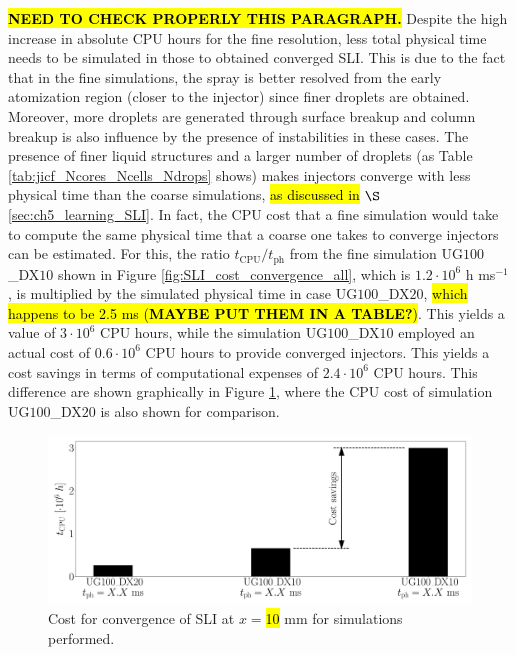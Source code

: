 \hl{\textbf{NEED TO CHECK PROPERLY THIS PARAGRAPH.}} Despite the high increase in absolute CPU hours for the fine resolution, less total physical time needs to be simulated in those to obtained converged SLI. This is due to the fact that in the fine simulations, the spray is better resolved from the early atomization region (closer to the injector) since finer droplets are obtained. Moreover,  more droplets are generated through surface breakup and column breakup is also influence by the presence of instabilities in these cases. The presence of finer liquid structures and a larger number of droplets (as Table \ref{tab:jicf_Ncores_Ncells_Ndrops} shows) makes injectors converge with less physical time than the coarse simulations, \hl{as discussed in} $\S$ \ref{sec:ch5_learning_SLI}. In fact, the CPU cost that a fine simulation would take to compute the same physical time that a coarse one takes to converge injectors can be estimated. For this, the ratio $t_\mathrm{CPU}/t_\mathrm{ph}$ from the fine simulation UG$100$\_DX$10$ shown in Figure \ref{fig:SLI_cost_convergence_all}, which is $1.2 \cdot 10^6$ h ms$^{-1}$, is multiplied by the simulated physical time in case UG$100$\_DX$20$, \hl{which happens to be 2.5 ms (\textbf{MAYBE PUT THEM IN A TABLE?})}. This yields a value of $3 \cdot 10^6$ CPU hours, while the simulation UG$100$\_DX$10$ employed an actual cost of $0.6 \cdot 10^6$ CPU hours to provide converged injectors. This yields a cost savings in terms of computational expenses of $2.4 \cdot 10^6$ CPU hours. This difference are shown graphically in Figure \ref{fig:SLI_cost_convergence_savings}, where the CPU cost of simulation UG$100$\_DX$20$ is also shown for comparison.


\begin{figure}[ht]
   \centering
   \includegraphics[scale=0.215]{./part2_developments/figures_ch5_resolved_JICF/SLI_cost_for_convergence/cost_savings_simulations}
   \caption{Cost for convergence of SLI at $x = $\hl{10} mm for simulations performed.}
   \label{fig:SLI_cost_convergence_savings}
\end{figure}

